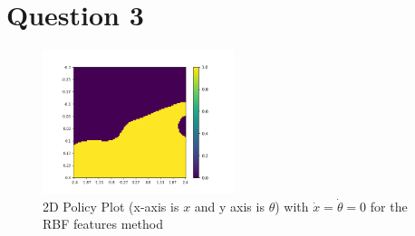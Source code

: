 \documentclass[a4paper]{article}
\begin{document}
\section*{Question 3}
\begin{figure}[h!]
    \centering
    \includegraphics[width=0.5\textwidth]{policy.png}
    \caption{2D Policy Plot (x-axis is $x$ and y axis is $\theta$) with $\dot{x}=\dot{\theta}=0$ for the RBF features method}
    \label{fig-policy}
\end{figure}
\end{document}
